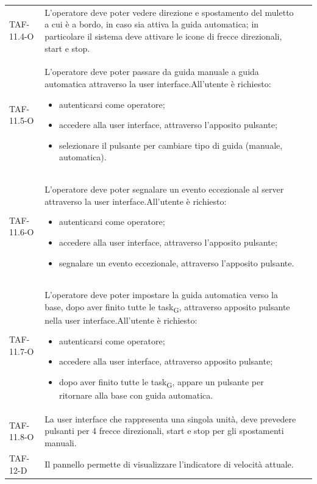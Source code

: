\begin{longtable}{ >{\centering}p{} >{}p{}
		>{\centering}p{}}
	TAF-11.4-O & L'operatore deve poter vedere direzione e spostamento del muletto a cui è a bordo, in caso sia attiva la guida automatica; in particolare il sistema deve attivare le icone di frecce direzionali, start e stop.  & 0\tabularnewline

	TAF-11.5-O & L'operatore deve poter passare da guida manuale a guida automatica attraverso la user interface.\newline All'utente è richiesto: \begin{itemize} \item autenticarsi come operatore; \item accedere alla user interface, attraverso l'apposito pulsante; \item selezionare il pulsante per cambiare tipo di guida (manuale, automatica). \end{itemize} & 0\tabularnewline

	TAF-11.6-O & L'operatore deve poter segnalare un evento eccezionale al server attraverso la user interface.\newline All'utente è richiesto: \begin{itemize} \item autenticarsi come operatore; \item accedere alla user interface, attraverso l'apposito pulsante; \item segnalare un evento eccezionale, attraverso l'apposito pulsante.\end{itemize} & 0\tabularnewline

	TAF-11.7-O & L'operatore deve poter impostare la guida automatica verso la base, dopo aver finito tutte le \gls{task}\textsubscript{G}, attraverso apposito pulsante nella user interface.\newline All'utente è richiesto: \begin{itemize} \item autenticarsi come operatore; \item accedere alla user interface, attraverso apposito pulsante; \item dopo aver finito tutte le \gls{task}\textsubscript{G}, appare un pulsante per ritornare alla base con guida automatica.\end{itemize} & 0\tabularnewline

	TAF-11.8-O & La user interface che rappresenta una singola unità, deve prevedere pulsanti per 4 frecce direzionali, start e stop per gli spostamenti manuali. & 0\tabularnewline

	TAF-12-D & Il pannello permette di visualizzare l'indicatore di velocità attuale. & 0\tabularnewline


\end{longtable}
